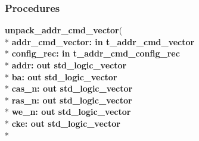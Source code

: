 \subsubsection*{Procedures}
 \begin{DoxyCompactItemize}
\item 
{\bfseries {\bfseries \textcolor{vhdlchar}{ }}} {\bf unpack\+\_\+addr\+\_\+cmd\+\_\+vector}( \\*
{\bfseries \textcolor{vhdlchar}{ }\textcolor{vhdlchar}{addr\+\_\+cmd\+\_\+vector\+: }\textcolor{stringliteral}{} {\bfseries \textcolor{keywordflow}{in}\textcolor{vhdlchar}{ }\textcolor{vhdlchar}{t\+\_\+addr\+\_\+cmd\+\_\+vector}\textcolor{vhdlchar}{ }}}\\*
  {\bfseries \textcolor{vhdlchar}{ }\textcolor{vhdlchar}{config\+\_\+rec\+: }\textcolor{stringliteral}{} {\bfseries \textcolor{keywordflow}{in}\textcolor{vhdlchar}{ }\textcolor{vhdlchar}{t\+\_\+addr\+\_\+cmd\+\_\+config\+\_\+rec}\textcolor{vhdlchar}{ }}}\\*
  {\bfseries \textcolor{vhdlchar}{ }\textcolor{vhdlchar}{addr\+: }\textcolor{stringliteral}{} {\bfseries \textcolor{keywordflow}{out}\textcolor{vhdlchar}{ }\textcolor{comment}{std\+\_\+logic\+\_\+vector}\textcolor{vhdlchar}{ }}}\\*
  {\bfseries \textcolor{vhdlchar}{ }\textcolor{vhdlchar}{ba\+: }\textcolor{stringliteral}{} {\bfseries \textcolor{keywordflow}{out}\textcolor{vhdlchar}{ }\textcolor{comment}{std\+\_\+logic\+\_\+vector}\textcolor{vhdlchar}{ }}}\\*
  {\bfseries \textcolor{vhdlchar}{ }\textcolor{vhdlchar}{cas\+\_\+n\+: }\textcolor{stringliteral}{} {\bfseries \textcolor{keywordflow}{out}\textcolor{vhdlchar}{ }\textcolor{comment}{std\+\_\+logic\+\_\+vector}\textcolor{vhdlchar}{ }}}\\*
  {\bfseries \textcolor{vhdlchar}{ }\textcolor{vhdlchar}{ras\+\_\+n\+: }\textcolor{stringliteral}{} {\bfseries \textcolor{keywordflow}{out}\textcolor{vhdlchar}{ }\textcolor{comment}{std\+\_\+logic\+\_\+vector}\textcolor{vhdlchar}{ }}}\\*
  {\bfseries \textcolor{vhdlchar}{ }\textcolor{vhdlchar}{we\+\_\+n\+: }\textcolor{stringliteral}{} {\bfseries \textcolor{keywordflow}{out}\textcolor{vhdlchar}{ }\textcolor{comment}{std\+\_\+logic\+\_\+vector}\textcolor{vhdlchar}{ }}}\\*
  {\bfseries \textcolor{vhdlchar}{ }\textcolor{vhdlchar}{cke\+: }\textcolor{stringliteral}{} {\bfseries \textcolor{keywordflow}{out}\textcolor{vhdlchar}{ }\textcolor{comment}{std\+\_\+logic\+\_\+vector}\textcolor{vhdlchar}{ }}}\\*

\end{DoxyCompactItemize}
